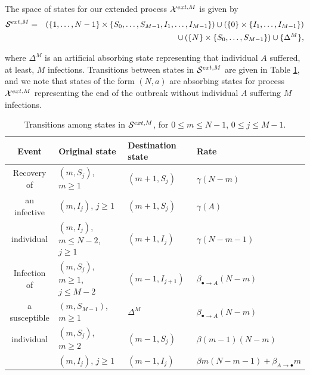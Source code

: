 \documentclass[preprint,12pt]{elsarticle}
\begin{document}
\par The space of states for our extended process ${\cal X}^{ext,M}$ is given by
\begin{eqnarray*}
 {\cal S}^{ext,M} &=& \left(\{1,\dots,N-1\}\times\{S_0,\dots,S_{M-1},I_1,\dots,I_{M-1}\}\right)\cup\left(\{0\}\times\{I_1,\dots,I_{M-1}\}\right)\\
&&\cup\left(\{N\}\times\{S_0,\dots,S_{M-1}\}\right)\cup\{\Delta^M\},
\end{eqnarray*}
\par\noindent where $\Delta^M$ is an artificial absorbing state representing that individual $A$ suffered, at least, $M$ infections. Transitions
between states in ${\cal S}^{ext,M}$ are given in Table \ref{tab:new1}, and we note that states of the form $(N,a)$ are absorbing states for process ${\cal X}^{ext,M}$
representing the end of the outbreak without individual $A$ suffering $M$ infections.

\begin{table}[h]
\centering
\begin{tabular}{|c|l|l|l|}
\hline
Event & Original state & Destination state & Rate\\
\hline
Recovery of & $(m,S_j)$, $m\geq1$ & $(m+1,S_j)$ & $\gamma(N-m)$\\
an infective & $(m,I_j)$, $j\geq1$ & $(m+1,S_j)$ & $\gamma(A)$\\
individual & $(m,I_j)$, $m\leq N-2$, $j\geq1$ & $(m+1,I_j)$ & $\gamma(N-m-1)$\\
\hline
Infection of & $(m,S_j)$, $m\geq1$, $j\leq M-2$ & $(m-1,I_{j+1})$ & $\beta_{\bullet\rightarrow A}(N-m)$\\
a susceptible & $(m,S_{M-1})$, $m\geq1$ & $\Delta^M$ & $\beta_{\bullet\rightarrow A}(N-m)$\\
individual & $(m,S_j)$, $m\geq2$ & $(m-1,S_j)$ & $\beta(m-1)(N-m)$\\
 & $(m,I_j)$, $j\geq1$ & $(m-1,I_j)$ & $\beta m(N-m-1)+\beta_{A\rightarrow\bullet}m$\\
\hline
\end{tabular}
\caption{Transitions among states in ${\cal S}^{ext,M}$, for $0\leq m\leq N-1$, $0\leq j\leq M-1$.}
\label{tab:new1}
\end{table}
\end{document}
